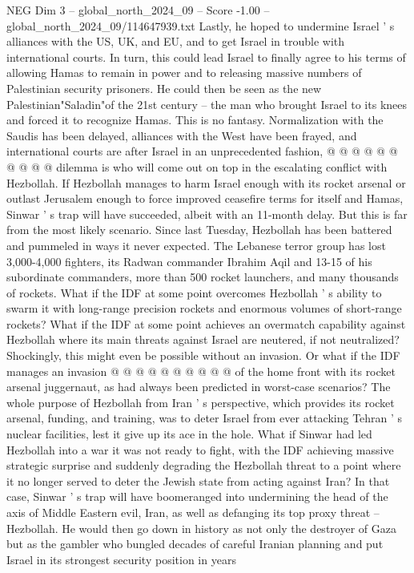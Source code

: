 \begin{textsample}{NEG Dim 3 – global\_north\_2024\_09 – Score -1.00 – global\_north\_2024\_09/114647939.txt}
Lastly, he hoped to undermine Israel ' s alliances with the US, UK, and EU, and to get Israel in trouble with international courts.
In turn, this could lead Israel to finally agree to his terms of allowing Hamas to remain in power and to releasing massive numbers of Palestinian security prisoners.
He could then be seen as the new Palestinian"Saladin"of the 21st century -- the man who brought Israel to its knees and forced it to recognize Hamas.
This is no fantasy.
Normalization with the Saudis has been delayed, alliances with the West have been frayed, and international courts are after Israel in an unprecedented fashion, @ @ @ @ @ @ @ @ @ @ dilemma is who will come out on top in the escalating conflict with Hezbollah.
If Hezbollah manages to harm Israel enough with its rocket arsenal or outlast Jerusalem enough to force improved ceasefire terms for itself and Hamas, Sinwar ' s trap will have succeeded, albeit with an 11-month delay.
But this is far from the most likely scenario.
Since last Tuesday, Hezbollah has been battered and pummeled in ways it never expected.
The Lebanese terror group has lost 3,000-4,000 fighters, its Radwan commander Ibrahim Aqil and 13-15 of his subordinate commanders, more than 500 rocket launchers, and many thousands of rockets.
What if the IDF at some point overcomes Hezbollah ' s ability to swarm it with long-range precision rockets and enormous volumes of short-range rockets?
What if the IDF at some point achieves an overmatch capability against Hezbollah where its main threats against Israel are neutered, if not neutralized?
Shockingly, this might even be possible without an invasion.
Or what if the IDF manages an invasion @ @ @ @ @ @ @ @ @ @ of the home front with its rocket arsenal juggernaut, as had always been predicted in worst-case scenarios?
The whole purpose of Hezbollah from Iran ' s perspective, which provides its rocket arsenal, funding, and training, was to deter Israel from ever attacking Tehran ' s nuclear facilities, lest it give up its ace in the hole.
What if Sinwar had led Hezbollah into a war it was not ready to fight, with the IDF achieving massive strategic surprise and suddenly degrading the Hezbollah threat to a point where it no longer served to deter the Jewish state from acting against Iran?
In that case, Sinwar ' s trap will have boomeranged into undermining the head of the axis of Middle Eastern evil, Iran, as well as defanging its top proxy threat -- Hezbollah.
He would then go down in history as not only the destroyer of Gaza but as the gambler who bungled decades of careful Iranian planning and put Israel in its strongest security position in years

\end{textsample}
